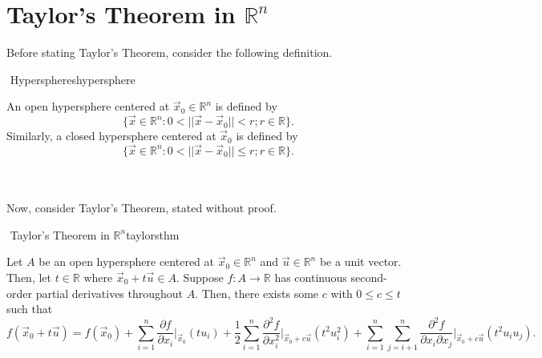 \section{Taylor's Theorem in \(\mathbb{R}^n\)}

    Before stating Taylor's Theorem, consider the following definition.
    \begin{definition}{\Stop\,\,Hyperspheres}{hypersphere}

        An open hypersphere centered at \(\vec{x}_0\in\mathbb{R}^n\) is defined by
        \begin{equation*}
            \{\vec{x}\in\mathbb{R}^n:0<||\vec{x}-\vec{x}_0||<r;r\in\mathbb{R}\}.
        \end{equation*}
        Similarly, a closed hypersphere centered at \(\vec{x}_0\) is defined by
        \begin{equation*}
            \{\vec{x}\in\mathbb{R}^n:0<||\vec{x}-\vec{x}_0||\leq r;r\in\mathbb{R}\}.
        \end{equation*}

    \end{definition}
    \vphantom
    \\
    \\
    Now, consider Taylor's Theorem, stated without proof.
    \begin{theorem}{\Stop\,\,Taylor's Theorem in \(\mathbb{R}^n\)}{taylorsthm}

        Let \(A\) be an open hypersphere centered at \(\vec{x}_0\in\mathbb{R}^n\) and \(\vec{u}\in\mathbb{R}^n\) be a unit vector. Then, let \(t\in\mathbb{R}\) where \(\vec{x}_0+t\vec{u}\in A\). Suppose \(f:A\to\mathbb{R}\) has continuous second-order partial derivatives throughout \(A\). Then, there exists some \(c\) with \(0\leq c\leq t\) such that
        \begin{equation*}
            f(\vec{x}_0+t\vec{u})=f(\vec{x}_0)+\sum_{i=1}^n \frac{\partial f}{\partial x_i}\Big|_{\vec{x}_0}(tu_i)+\frac{1}{2}\sum_{i=1}^n \frac{\partial^2f}{\partial x_i^2}\Big|_{\vec{x}_0+c\vec{u}}(t^2u_i^2)+\sum_{i=1}^n\sum_{j=i+1}^n\frac{\partial^2f}{\partial x_i\partial x_j}\Big|_{\vec{x}_0+c\vec{u}}(t^2u_iu_j).
        \end{equation*}
        
    \end{theorem}
    \pagebreak
    \vphantom
    \\
    \\
